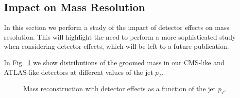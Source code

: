 \documentclass[11pt,letterpaper]{article}
\DeclareRobustCommand{\Fig}[1]{Fig.~\ref{#1}}
\begin{document}
\subsection{Impact on Mass Resolution}\label{sec:detector_robust}

In this section we perform a study of the impact of detector effects on mass resolution. This will highlight the need to perform a more sophisticated study when considering detector effects, which will be left to a future publication.

In \Fig{fig:mass-detector} we show distributions of the groomed mass in our CMS-like and ATLAS-like detectors at different values of the jet $p_T$.

\begin{figure}
  \caption{Mass reconstruction with detector effects as a function of the jet $p_T$.}
  \label{fig:mass-detector}
\end{figure}
\end{document}
